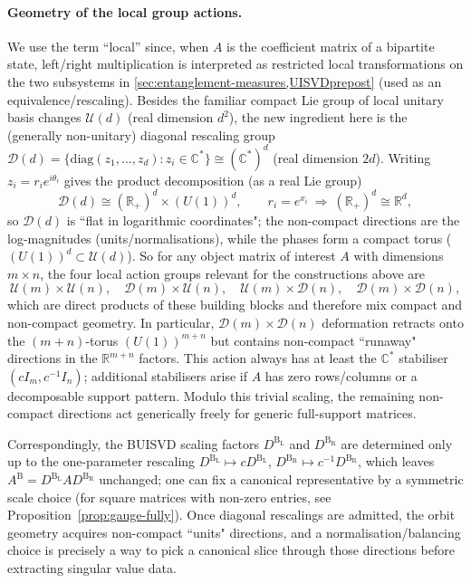 \documentclass[11pt,a4paper]{article}
\newcommand{\be}{\begin{equation}}
\newcommand{\ee}{\end{equation}}
\begin{document}
\paragraph{Geometry of the local group actions.} We use the term ``local'' since, when $A$ is the coefficient matrix of a bipartite state, left/right multiplication is interpreted as restricted local transformations on the two subsystems in \cref{sec:entanglement-measures,UISVDprepost} (used as an equivalence/rescaling). Besides the familiar compact Lie group of local unitary basis changes \(\mathcal U(d)\) (real dimension \(d^{2}\)), the new ingredient here is the (generally non-unitary) diagonal
rescaling group \(\mathcal D(d)=\{\mathrm{diag}(z_1,\dots,z_d):z_i\in\mathbb C^*\}\cong(\mathbb C^*)^{d}\) (real dimension \(2d\)). Writing \(z_i=r_i e^{i\theta_i}\) gives the product decomposition (as a real Lie group)
\be
\mathcal D(d)\cong(\mathbb R_{+})^{d}\times (U(1))^{d},\qquad
r_i=e^{x_i}\ \Rightarrow\ (\mathbb R_{+})^{d}\cong\mathbb R^{d},
\ee
so \(\mathcal D(d)\) is ``flat in logarithmic coordinates"; the non-compact directions are the log-magnitudes (units/normalisations), while the phases form a compact torus
(\((U(1))^{d}\subset\mathcal U(d)\)). So for any object matrix of interest $A$ with dimensions $m\times n$, the four local action groups relevant for the constructions above are
\be
\mathcal U(m)\times \mathcal U(n),\quad
\mathcal D(m)\times \mathcal U(n),\quad
\mathcal U(m)\times \mathcal D(n),\quad
\mathcal D(m)\times \mathcal D(n),
\ee
which are direct products of these building blocks and therefore mix compact and non-compact geometry. In particular, \(\mathcal D(m)\times \mathcal D(n)\) deformation retracts onto the $(m+n)$-torus \((U(1))^{m+n}\) but contains non-compact ``runaway" directions in the \(\mathbb R^{m+n}\) factors. This action always has at least the $\mathbb C^*$ stabiliser $(cI_m,c^{-1}I_n)$; additional stabilisers arise if $A$ has zero rows/columns or a decomposable support pattern. Modulo this trivial scaling, the remaining non-compact directions act generically freely for generic full-support matrices.

Correspondingly, the BUISVD scaling factors \(D^\mathrm{B_L}\) and \(D^\mathrm{B_R}\) are determined only up to the one-parameter rescaling \(D^\mathrm{B_L}\mapsto cD^\mathrm{B_L}\), \(D^\mathrm{B_R}\mapsto c^{-1}D^\mathrm{B_R}\), which leaves \(A^{\mathrm B}=D^\mathrm{B_L}AD^\mathrm{B_R}\) unchanged; one can fix a canonical representative by a symmetric scale choice (for square matrices with non-zero entries, see Proposition~\ref{prop:gauge-fully}). Once diagonal rescalings are admitted, the orbit geometry acquires non-compact ``units" directions, and a normalisation/balancing choice is precisely a way to pick a canonical slice through those directions before extracting singular value data.
\end{document}
